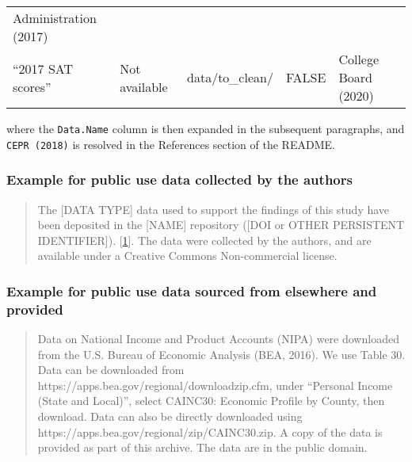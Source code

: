 \documentclass[
]{article}
\begin{document}
\begin{longtable}[]{@{}lllll@{}}
\begin{minipage}[t]{0.17\columnwidth}
Administration (2017)\strut
\end{minipage}\tabularnewline
\begin{minipage}[t]{0.17\columnwidth}\raggedright
``2017 SAT scores''\strut
\end{minipage} & \begin{minipage}[t]{0.17\columnwidth}\raggedright
Not available\strut
\end{minipage} & \begin{minipage}[t]{0.17\columnwidth}\raggedright
data/to\_clean/\strut
\end{minipage} & \begin{minipage}[t]{0.17\columnwidth}\raggedright
FALSE\strut
\end{minipage} & \begin{minipage}[t]{0.17\columnwidth}\raggedright
College Board (2020)\strut
\end{minipage}\tabularnewline
\bottomrule
\end{longtable}

where the \texttt{Data.Name} column is then expanded in the subsequent
paragraphs, and \texttt{CEPR\ (2018)} is resolved in the References
section of the README.

\hypertarget{example-for-public-use-data-collected-by-the-authors}{%
\subsubsection{Example for public use data collected by the
authors}\label{example-for-public-use-data-collected-by-the-authors}}

\begin{quote}
The {[}DATA TYPE{]} data used to support the findings of this study have
been deposited in the {[}NAME{]} repository ({[}DOI or OTHER PERSISTENT
IDENTIFIER{]}).
{[}\href{https://www.hindawi.com/research.data/\#statement.templates}{1}{]}.
The data were collected by the authors, and are available under a
Creative Commons Non-commercial license.
\end{quote}

\hypertarget{example-for-public-use-data-sourced-from-elsewhere-and-provided}{%
\subsubsection{Example for public use data sourced from elsewhere and
provided}\label{example-for-public-use-data-sourced-from-elsewhere-and-provided}}

\begin{quote}
Data on National Income and Product Accounts (NIPA) were downloaded from
the U.S. Bureau of Economic Analysis (BEA, 2016). We use Table 30. Data
can be downloaded from https://apps.bea.gov/regional/downloadzip.cfm,
under ``Personal Income (State and Local)'', select CAINC30: Economic
Profile by County, then download. Data can also be directly downloaded
using https://apps.bea.gov/regional/zip/CAINC30.zip. A copy of the data
is provided as part of this archive. The data are in the public domain.
\end{quote}
\end{document}

